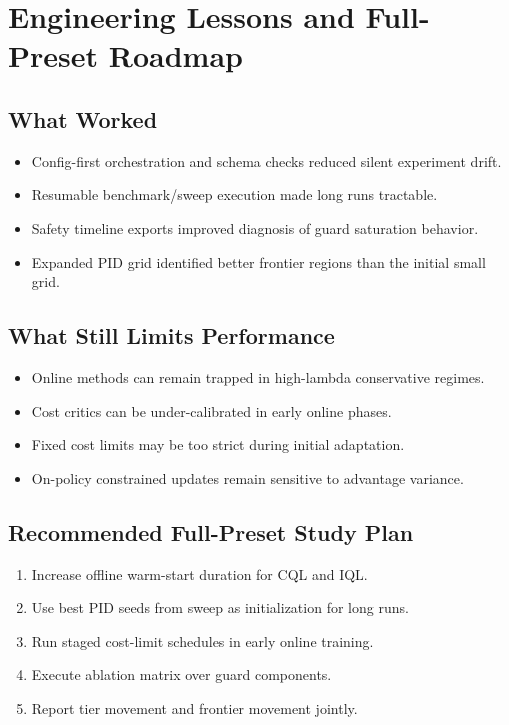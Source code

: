 \documentclass[conference]{IEEEtran}
\begin{document}
\section{Engineering Lessons and Full-Preset Roadmap}
\subsection{What Worked}
\begin{itemize}[leftmargin=*]
  \item Config-first orchestration and schema checks reduced silent experiment drift.
  \item Resumable benchmark/sweep execution made long runs tractable.
  \item Safety timeline exports improved diagnosis of guard saturation behavior.
  \item Expanded PID grid identified better frontier regions than the initial small grid.
\end{itemize}

\subsection{What Still Limits Performance}
\begin{itemize}[leftmargin=*]
  \item Online methods can remain trapped in high-lambda conservative regimes.
  \item Cost critics can be under-calibrated in early online phases.
  \item Fixed cost limits may be too strict during initial adaptation.
  \item On-policy constrained updates remain sensitive to advantage variance.
\end{itemize}

\subsection{Recommended Full-Preset Study Plan}
\begin{enumerate}[leftmargin=*]
  \item Increase offline warm-start duration for CQL and IQL.
  \item Use best PID seeds from sweep as initialization for long runs.
  \item Run staged cost-limit schedules in early online training.
  \item Execute ablation matrix over guard components.
  \item Report tier movement and frontier movement jointly.
\end{enumerate}
\end{document}
